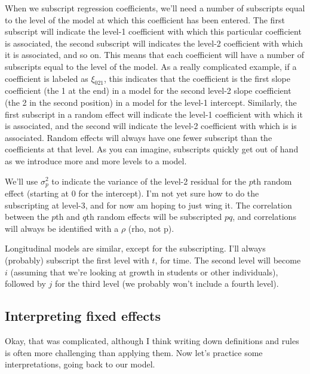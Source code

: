 \documentclass[
  letterpaper,
  DIV=11,
  numbers=noendperiod]{scrreprt}
\begin{document}
When we subscript regression coefficients, we'll need a number of
subscripts equal to the level of the model at which this coefficient has
been entered. The first subscript will indicate the level-1 coefficient
with which this particular coefficient is associated, the second
subscript will indicates the level-2 coefficient with which it is
associated, and so on. This means that each coefficient will have a
number of subscripts equal to the level of the model. As a really
complicated example, if a coefficient is labeled as \(\xi_{021}\), this
indicates that the coefficient is the first slope coefficient (the 1 at
the end) in a model for the second level-2 slope coefficient (the 2 in
the second position) in a model for the level-1 intercept. Similarly,
the first subscript in a random effect will indicate the level-1
coefficient with which it is associated, and the second will indicate
the level-2 coefficient with which is is associated. Random effects will
always have one fewer subscript than the coefficients at that level. As
you can imagine, subscripts quickly get out of hand as we introduce more
and more levels to a model.

We'll use \(\sigma^2_p\) to indicate the variance of the level-2
residual for the \(p\)th random effect (starting at 0 for the
intercept). I'm not yet sure how to do the subscripting at level-3, and
for now am hoping to just wing it. The correlation between the \(p\)th
and \(q\)th random effects will be subscripted \(pq\), and correlations
will always be identified with a \(\rho\) (rho, not p).

Longitudinal models are similar, except for the subscripting. I'll
always (probably) subscript the first level with \(t\), for time. The
second level will become \(i\) (assuming that we're looking at growth in
students or other individuals), followed by \(j\) for the third level
(we probably won't include a fourth level).

\hypertarget{interpreting-fixed-effects}{%
\subsection*{Interpreting fixed
effects}\label{interpreting-fixed-effects}}

Okay, that was complicated, although I think writing down definitions
and rules is often more challenging than applying them. Now let's
practice some interpretations, going back to our model.
\end{document}
